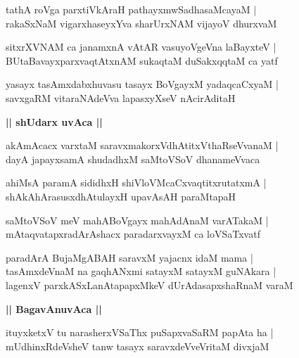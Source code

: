 \documentclass[twoside,12pt,openright]{book}
\newcounter{shloka}[chapter]
\def\uvaca#1{\centerline{{\large\textbf{#1}}}}
\begin{document}
\begin{shloka}%
tathA roVga parxtiVkAraH pathayxmwSadhasaMcayaM |\\
rakaSxNaM vigarxhaseyxYva sharUrxNAM vijayoV dhurxvaM 
\end{shloka}

\begin{shloka}%
sitxrXVNAM ca janamxnA vAtAR vasuyoVgeVna laBayxteV |\\
BUtaBavayxparxvaqtAtxnAM sukaqtaM duSakxqqtaM ca yatf
\end{shloka}

\begin{shloka}%
yasayx tasAmxdabxhuvasu tasayx BoVgayxM yadaqcaCxyaM |\\
savxgaRM vitaraNAdeVva lapasxyXseV nAcirAditaH 
\end{shloka}

\uvaca{|| shUdarx uvAca ||}

\begin{shloka}%
akAmAcacx varxtaM saravxmakorxVdhAtitxVthaRseVvanaM |\\
dayA japayxsamA shudadhxM saMtoVSoV dhanameVvaca
\end{shloka}

\begin{shloka}%
ahiMsA paramA sididhxH shiVloVMcaCxvaqtitxrutatxmA |\\
shAkAhArasusxdhAtulayxH upavAsAH paraMtapaH 
\end{shloka}

\begin{shloka}%
saMtoVSoV meV mahABoVgayx mahAdAnaM varATakaM |\\
mAtaqvatapxradArAshacx paradarxvayxM ca loVSaTxvatf
\end{shloka}

\begin{shloka}%
paradArA BujaMgABAH saravxM yajacnx idaM mama |\\
tasAmxdeVnaM na gaqhANxmi satayxM satayxM guNAkara |\\
lagenxV parxkASxLanAtapapxMkeV dUrAdasapxshaRnaM varaM 
\end{shloka}

\uvaca{|| BagavAnuvAca ||}

\begin{shloka}%
ituyxketxV tu narasherxVSaThx puSapxvaSaRM papAta ha |\\
mUdhinxRdeVsheV tanw tasayx saravxdeVveVritaM divxjaM 
\end{shloka}
\end{document}
